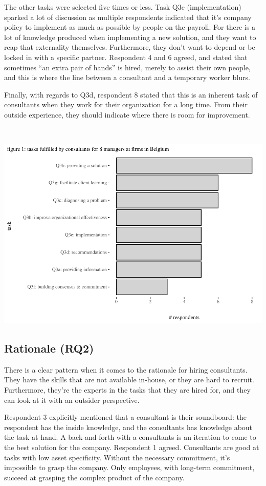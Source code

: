 \documentclass[12pt]{article}
\begin{document}
The other tasks were selected five times or less. Task Q3e
(implementation) sparked a lot of discussion as multiple respondents
indicated that it's company policy to implement as much as possible by
people on the payroll. For there is a lot of knowledge produced when
implementing a new solution, and they want to reap that externality
themselves. Furthermore, they don't want to depend or be locked in with
a specific partner. Respondent 4 and 6 agreed, and stated that sometimes
``an extra pair of hands'' is hired, merely to assist their own people,
and this is where the line between a consultant and a temporary worker
blurs.

Finally, with regards to Q3d, respondent 8 stated that this is an
inherent task of consultants when they work for their organization for a
long time. From their outside experience, they should indicate where
there is room for improvement.

\(~\)

\includegraphics{2_ams_five_pager_files/figure-latex/unnamed-chunk-3-1.pdf}

\subsection{Rationale (RQ2)}\label{rationale-rq2}

There is a clear pattern when it comes to the rationale for hiring
consultants. They have the skills that are not available in-house, or
they are hard to recruit. Furthermore, they're the experts in the tasks
that they are hired for, and they can look at it with an outsider
perspective.

Respondent 3 explicitly mentioned that a consultant is their soundboard:
the respondent has the inside knowledge, and the consultants has
knowledge about the task at hand. A back-and-forth with a consultants is
an iteration to come to the best solution for the company. Respondent 1
agreed. Consultants are good at tasks with low asset specificity.
Without the necessary commitment, it's impossible to grasp the company.
Only employees, with long-term commitment, succeed at grasping the
complex product of the company.
\end{document}

